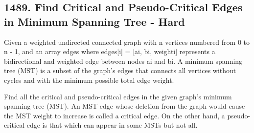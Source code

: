 \documentclass[9pt, b5paaper]{book}
\begin{document}
\subsection{1489. Find Critical and Pseudo-Critical Edges in Minimum Spanning Tree - Hard}
\label{sec-1-9-1}
Given a weighted undirected connected graph with n vertices numbered from 0 to n - 1, and an array edges where edges[i] = [ai, bi, weighti] represents a bidirectional and weighted edge between nodes ai and bi. A minimum spanning tree (MST) is a subset of the graph's edges that connects all vertices without cycles and with the minimum possible total edge weight.

Find all the critical and pseudo-critical edges in the given graph's minimum spanning tree (MST). An MST edge whose deletion from the graph would cause the MST weight to increase is called a critical edge. On the other hand, a pseudo-critical edge is that which can appear in some MSTs but not all.
\end{document}

